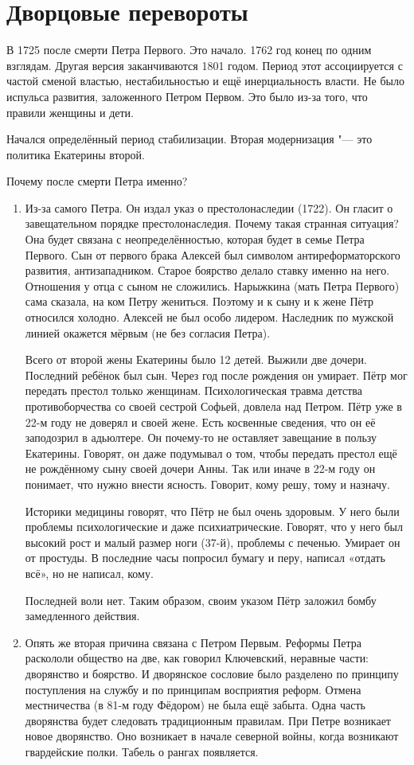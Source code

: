 \section{Дворцовые перевороты}
В 1725 после смерти Петра Первого. Это начало. 1762 год конец по одним взглядам. Другая версия заканчиваются 1801 годом. Период этот ассоциируется с частой сменой властью, нестабильностью и ещё инерциальность власти. Не было испульса развития, заложенного Петром Первом. Это было из-за того, что правили женщины и дети. 

Начался определённый период стабилизации. Вторая модернизация "--- это политика Екатерины второй.

Почему после смерти Петра именно?
\begin{enumerate}
\item Из-за самого Петра. Он издал указ о престолонаследии (1722). Он гласит о завещательном порядке престолонаследия. Почему такая странная ситуация? Она будет связана с неопределённостью, которая будет в семье Петра Первого. Сын от первого брака Алексей был символом антиреформаторского развития, антизападником. Старое боярство делало ставку именно на него. Отношения у отца с сыном не сложились. Нарыжкина (мать Петра Первого) сама сказала, на ком Петру жениться. Поэтому и к сыну и к жене Пётр относился холодно. Алексей не был особо лидером. Наследник по мужской линией окажется мёрвым (не без согласия Петра).

Всего от второй жены Екатерины было 12 детей.  Выжили две дочери. Последний ребёнок был сын. Через год после рождения он умирает. Пётр мог передать престол только женщинам. Психологическая травма детства противоборчества со своей сестрой Софьей, довлела над Петром. Пётр уже в 22-м году не доверял и своей жене. Есть косвенные сведения, что он её заподозрил в адьюлтере. Он почему-то не оставляет завещание в пользу Екатерины. Говорят, он даже подумывал о том, чтобы передать престол ещё не рождённому сыну своей дочери Анны. Так или иначе в 22-м году он понимает, что нужно внести ясность. Говорит, кому решу, тому и назначу.

Историки медицины говорят, что Пётр не был очень здоровым. У него были проблемы психологические и даже психиатрические. Говорят, что у него был высокий рост и малый размер ноги (37-й), проблемы с печенью. Умирает он от простуды. В последние часы попросил бумагу и перу, написал «отдать всё», но не написал, кому.

Последней воли нет. Таким образом, своим указом Пётр заложил бомбу замедленного действия.
\item Опять же вторая причина связана с Петром Первым. Реформы Петра раскололи общество на две, как говорил Ключевский, неравные части: дворянство и боярство. И дворянское сословие было разделено по принципу поступления на службу и по принципам восприятия реформ. Отмена местничества (в 81-м году Фёдором) не была ещё забыта. Одна часть дворянства будет следовать традиционным правилам. При Петре возникает новое дворянство. Оно возникает в начале северной войны, когда возникают гвардейские полки. Табель о рангах появляется.


\end{enumerate}
